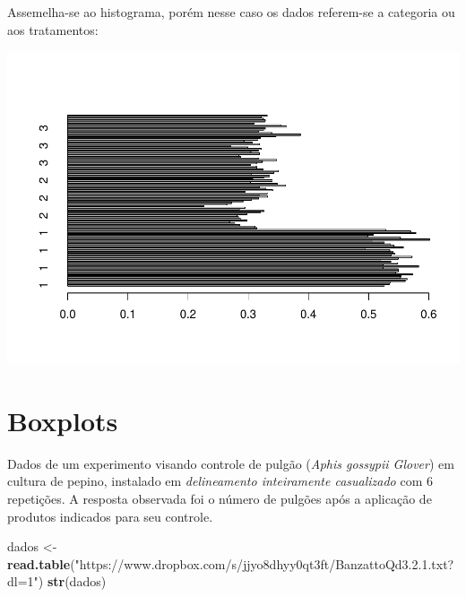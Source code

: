 \documentclass[
]{book}
\newenvironment{Shaded}{\begin{snugshade}}{\end{snugshade}}
\newcommand{\DataTypeTok}[1]{\textcolor[rgb]{0.13,0.29,0.53}{#1}}
\newcommand{\KeywordTok}[1]{\textcolor[rgb]{0.13,0.29,0.53}{\textbf{#1}}}
\newcommand{\NormalTok}[1]{#1}
\newcommand{\OperatorTok}[1]{\textcolor[rgb]{0.81,0.36,0.00}{\textbf{#1}}}
\newcommand{\StringTok}[1]{\textcolor[rgb]{0.31,0.60,0.02}{#1}}
\begin{document}
Assemelha-se ao histograma, porém nesse caso os dados referem-se a categoria ou aos tratamentos:

\begin{Shaded}
\end{Shaded}

\includegraphics{TudodoR_files/figure-latex/unnamed-chunk-169-1.pdf}

\hypertarget{boxplots}{%
\section{Boxplots}\label{boxplots}}

Dados de um experimento visando controle de pulgão (\emph{Aphis gossypii Glover}) em cultura de pepino, instalado em \emph{delineamento inteiramente casualizado} com 6 repetições. A resposta observada foi o número de pulgões após a aplicação de produtos indicados para seu controle.

\begin{Shaded}
\begin{Highlighting}[]
\NormalTok{dados <-}\StringTok{ }\KeywordTok{read.table}\NormalTok{(}\StringTok{"https://www.dropbox.com/s/jjyo8dhyy0qt3ft/BanzattoQd3.2.1.txt?dl=1"}\NormalTok{)}
\KeywordTok{str}\NormalTok{(dados)}
\end{Highlighting}
\end{Shaded}
\end{document}
